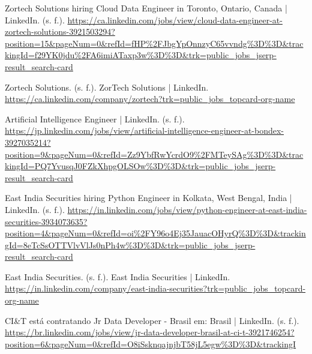 \documentclass[12pt]{article}
\begin{document}
\begin{thebibliography}{99}
         Zortech Solutions hiring Cloud Data Engineer in Toronto, Ontario, Canada | LinkedIn. (s. f.). \url{https://ca.linkedin.com/jobs/view/cloud-data-engineer-at-zortech-solutions-3921503294?position=15&pageNum=0&refId=fHP%2FJbgYpOnnzyC65vvndg%3D%3D&trackingId=f29YK0jdu%2FA6imiATaxp3w%3D%3D&trk=public_jobs_jserp-result_search-card}
        
         Zortech Solutions. (s. f.). ZorTech Solutions | LinkedIn. \url{https://ca.linkedin.com/company/zortech?trk=public_jobs_topcard-org-name}
        
         Artificial Intelligence Engineer | LinkedIn. (s. f.). \url{https://jp.linkedin.com/jobs/view/artificial-intelligence-engineer-at-bondex-3927035214?position=9&pageNum=0&refId=Zz9YbfRwYcrdO9%2FMTeySAg%3D%3D&trackingId=PQ7YvusqJ0FZkXhpgOLSOw%3D%3D&trk=public_jobs_jserp-result_search-card}
        
         East India Securities hiring Python Engineer in Kolkata, West Bengal, India | LinkedIn. (s. f.). \url{https://in.linkedin.com/jobs/view/python-engineer-at-east-india-securities-3934073635?position=4&pageNum=0&refId=oi%2FY96o4Ej35JauacOHyrQ%3D%3D&trackingId=8eTcSsOTTVlvVlJs0nPh4w%3D%3D&trk=public_jobs_jserp-result_search-card}
        
         East India Securities. (s. f.). East India Securities | LinkedIn. \url{https://in.linkedin.com/company/east-india-securities?trk=public_jobs_topcard-org-name}
        
         CI&T está contratando Jr Data Developer - Brasil em: Brasil | LinkedIn. (s. f.). \url{https://br.linkedin.com/jobs/view/jr-data-developer-brasil-at-ci-t-3921746254?position=6&pageNum=0&refId=O8iSsknqajnjbT58jL5egw%3D%3D&trackingI}
    \end{thebibliography}
        
\end{document}
